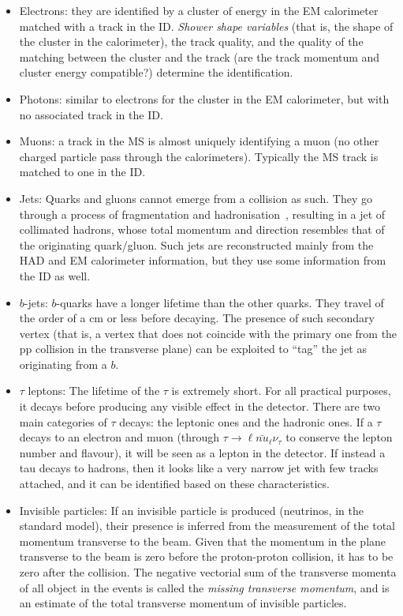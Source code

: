 \begin{itemize}
\item{Electrons:} they are identified by a cluster of energy in the EM calorimeter matched with a track in the ID. \textit{Shower shape variables} (that is, the shape of the cluster in the calorimeter), the track quality, and the quality of the matching between the cluster and the track (are the track momentum and cluster energy compatible?) determine the identification. 
\item{Photons:} similar to electrons for the cluster in the EM calorimeter, but with no associated track in the ID. 
\item{Muons:} a track in the MS is almost uniquely identifying a muon (no other charged particle pass through the calorimeters). Typically the MS track is matched to one in the ID. 
\item{Jets:} Quarks and gluons cannot emerge from a collision as such. They go through a process of fragmentation and hadronisation~\cite{fragment_hadronise}, resulting in a jet of collimated hadrons, whose total momentum and direction resembles that of the originating quark/gluon. Such jets are reconstructed mainly from the HAD and EM calorimeter information, but they use some information from the ID as well. 
\item{$b$-jets:} $b$-quarks have a longer lifetime than the other quarks. They travel of the order of a cm or less before decaying. The presence of such secondary vertex (that is, a vertex that does not coincide with the primary one from the pp collision in the transverse plane) can be exploited to ``tag'' the jet as originating from a $b$.
\item{$\tau$ leptons:} The lifetime of the $\tau$ is extremely short. For all practical purposes, it decays before producing any visible effect in the detector. There are two main categories of $\tau$ decays: the leptonic ones and the hadronic ones. If a $\tau$ decays to an electron and muon (through $\tau\rightarrow \ell \bar{nu}_{\ell} \nu_{\tau}$ to conserve the lepton number and flavour), it will be seen as a lepton in the detector. If instead a tau decays to hadrons, then it looks like a very narrow jet with few tracks attached, and it can be identified based on these characteristics. 
\item{Invisible particles:} If an invisible particle is produced (neutrinos, in the standard model), their presence is inferred from the measurement of the total momentum transverse to the beam. Given that the momentum in the plane transverse to the beam is zero before the proton-proton collision, it has to be zero after the collision. The negative vectorial sum of the transverse momenta of all object in the events is called the \textit{missing transverse momentum}, and is an estimate of the total transverse momentum of invisible particles.   
\end{itemize}

